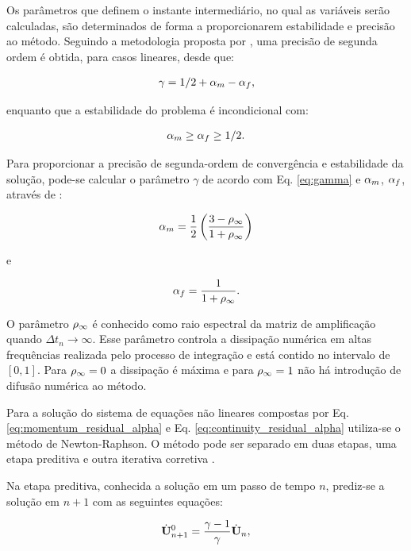 \documentclass[tese_patricia]{subfiles}%
\begin{document}
Os parâmetros que definem o instante intermediário, no qual as variáveis serão calculadas, são determinados de forma a proporcionarem estabilidade e precisão ao método. Seguindo a metodologia proposta por , uma precisão de segunda ordem é obtida, para casos lineares, desde que: 

\begin{gather}
\gamma = 1/2 + \alpha_m - \alpha_f,\label{eq:gamma}
\end{gather}

\noindent enquanto que a estabilidade do problema é incondicional com:

\begin{gather}
\alpha_m \ge \alpha_f \ge 1/2.
\end{gather}

Para proporcionar a precisão de segunda-ordem de convergência e estabilidade da solução, pode-se calcular o parâmetro $\gamma$ de acordo com Eq. \ref {eq:gamma} e $\alpha_m$, $\alpha_f$, através de \cite{Hughes:2000}:


\begin{gather}
\alpha_m = \frac{1}{2}\left(\frac{3 - \rho_\infty}{1+\rho_\infty}\right)\label{eq:alpha_m_fluid}\\
\end{gather}

\noindent e

\begin{gather}
\alpha_f = \frac{1}{1+\rho_\infty}\label{eq:alpha_f_fluid}.
\end{gather}

O parâmetro $\rho_\infty$ é conhecido como raio espectral da matriz de amplificação quando $\Delta t_{n} \rightarrow \infty$. Esse parâmetro controla a dissipação numérica em altas frequências realizada pelo processo de integração e está contido no intervalo de $[0,1]$. Para $\rho_\infty = 0$ a dissipação é máxima e para $\rho_\infty = 1$ não há introdução de difusão numérica ao método.

Para a solução do sistema de equações não lineares compostas por Eq. \eqref{eq:momentum_residual_alpha} e Eq. \eqref{eq:continuity_residual_alpha} utiliza-se o método de Newton-Raphson. O método pode ser separado em duas etapas, uma etapa preditiva e outra iterativa corretiva \cite{BazilevsTT:2013}.

Na etapa preditiva, conhecida a solução em um passo de tempo $n$, prediz-se a solução em $n+1$ com as seguintes equações:

\begin{align}
\dot{\mathbf{U}}_{n+1}^{0} = \frac{\gamma-1}{\gamma}\dot{\mathbf{U}}_{n} \label{eq:Pred1},
\end{align}
\end{document}
